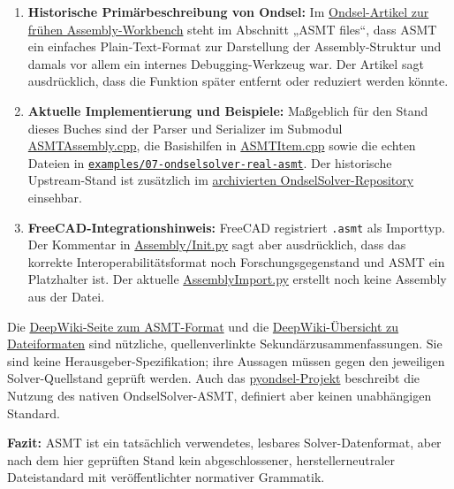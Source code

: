 \documentclass[
  12pt
]{book}
\providecommand{\tightlist}{%
  \setlength{\itemsep}{0pt}\setlength{\parskip}{0pt}}
\begin{document}
\begin{enumerate}
\def\labelenumi{\arabic{enumi}.}
\tightlist
\item
  \textbf{Historische Primärbeschreibung von Ondsel:} Im
  \href{https://www.ondsel.com/blog/assembly-wb-prerelease/}{Ondsel-Artikel
  zur frühen Assembly-Workbench} steht im Abschnitt „ASMT files``, dass
  ASMT ein einfaches Plain-Text-Format zur Darstellung der
  Assembly-Struktur und damals vor allem ein internes Debugging-Werkzeug
  war. Der Artikel sagt ausdrücklich, dass die Funktion später entfernt
  oder reduziert werden könnte.
\item
  \textbf{Aktuelle Implementierung und Beispiele:} Maßgeblich für den
  Stand dieses Buches sind der Parser und Serializer im Submodul
  \href{vendor/OndselSolver/OndselSolver/ASMTAssembly.cpp}{ASMTAssembly.cpp},
  die Basishilfen in
  \href{vendor/OndselSolver/OndselSolver/ASMTItem.cpp}{ASMTItem.cpp}
  sowie die echten Dateien in
  \href{./examples/07-ondselsolver-real-asmt/README.md}{\texttt{examples/07-ondselsolver-real-asmt}}.
  Der historische Upstream-Stand ist zusätzlich im
  \href{https://github.com/Ondsel-Development/OndselSolver/tree/09d6175a}{archivierten
  OndselSolver-Repository} einsehbar.
\item
  \textbf{FreeCAD-Integrationshinweis:} FreeCAD registriert
  \texttt{.asmt} als Importtyp. Der Kommentar in
  \href{https://github.com/FreeCAD/FreeCAD/blob/main/src/Mod/Assembly/Init.py}{Assembly/Init.py}
  sagt aber ausdrücklich, dass das korrekte Interoperabilitätsformat
  noch Forschungsgegenstand und ASMT ein Platzhalter ist. Der aktuelle
  \href{https://github.com/FreeCAD/FreeCAD/blob/main/src/Mod/Assembly/AssemblyImport.py}{AssemblyImport.py}
  erstellt noch keine Assembly aus der Datei.
\end{enumerate}

Die
\href{https://deepwiki.com/FreeCAD/OndselSolver/4.4-asmt-file-format}{DeepWiki-Seite
zum ASMT-Format} und die
\href{https://deepwiki.com/Ondsel-Development/OndselSolver/4-file-formats-and-exchange}{DeepWiki-Übersicht
zu Dateiformaten} sind nützliche, quellenverlinkte
Sekundärzusammenfassungen. Sie sind keine Herausgeber-Spezifikation;
ihre Aussagen müssen gegen den jeweiligen Solver-Quellstand geprüft
werden. Auch das
\href{https://github.com/deepsaia/pyondsel}{pyondsel-Projekt} beschreibt
die Nutzung des nativen OndselSolver-ASMT, definiert aber keinen
unabhängigen Standard.

\textbf{Fazit:} ASMT ist ein tatsächlich verwendetes, lesbares
Solver-Datenformat, aber nach dem hier geprüften Stand kein
abgeschlossener, herstellerneutraler Dateistandard mit veröffentlichter
normativer Grammatik.
\end{document}
